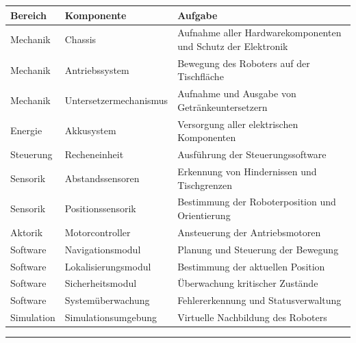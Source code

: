 \documentclass[
]{article}
\begin{document}
\begin{longtable}[]{@{}
  >{\raggedright\arraybackslash}p{}
  >{\raggedright\arraybackslash}p{}
  >{\raggedright\arraybackslash}p{}@{}}
\toprule\noalign{}
\begin{minipage}[b]{\linewidth}\raggedright
Bereich
\end{minipage} & \begin{minipage}[b]{\linewidth}\raggedright
Komponente
\end{minipage} & \begin{minipage}[b]{\linewidth}\raggedright
Aufgabe
\end{minipage} \\
\midrule\noalign{}
\endhead
\bottomrule\noalign{}
\endlastfoot
Mechanik & Chassis & Aufnahme aller Hardwarekomponenten und Schutz der
Elektronik \\
Mechanik & Antriebssystem & Bewegung des Roboters auf der Tischfläche \\
Mechanik & Untersetzermechanismus & Aufnahme und Ausgabe von
Getränkeuntersetzern \\
Energie & Akkusystem & Versorgung aller elektrischen Komponenten \\
Steuerung & Recheneinheit & Ausführung der Steuerungssoftware \\
Sensorik & Abstandssensoren & Erkennung von Hindernissen und
Tischgrenzen \\
Sensorik & Positionssensorik & Bestimmung der Roboterposition und
Orientierung \\
Aktorik & Motorcontroller & Ansteuerung der Antriebsmotoren \\
Software & Navigationsmodul & Planung und Steuerung der Bewegung \\
Software & Lokalisierungsmodul & Bestimmung der aktuellen Position \\
Software & Sicherheitsmodul & Überwachung kritischer Zustände \\
Software & Systemüberwachung & Fehlererkennung und Statusverwaltung \\
Simulation & Simulationsumgebung & Virtuelle Nachbildung des Roboters \\
\end{longtable}

\begin{center}\rule{0.5\linewidth}{0.5pt}\end{center}
\end{document}
